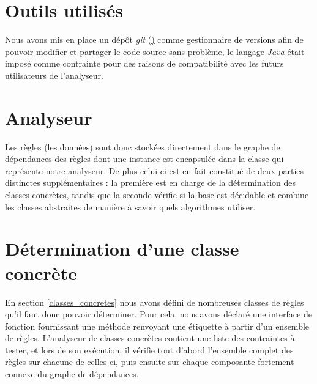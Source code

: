 
\section{Outils utilisés}\label{outils}
Nous avons mis en place un dépôt {\em git} (\href{}) 
comme gestionnaire de versions afin de pouvoir
modifier et partager le code source sans problème, le langage {\em Java} était imposé
comme contrainte
pour des raisons de compatibilité avec les futurs utilisateurs de l'analyseur.



\section{Analyseur}\label{impl_grd_analyser}
Les règles (les données) sont donc stockées directement dans le graphe de dépendances des
règles dont une instance est encapsulée dans la classe  qui représente
notre analyseur.
De plus celui-ci est en fait constitué de deux parties distinctes supplémentaires
: la première est en charge de la détermination des classes concrètes, tandis que la
seconde vérifie si la base est décidable et combine les classes
abstraites de manière à savoir quels algorithmes utiliser.

\section{Détermination d'une classe concrète}\label{impl_classe_concrete}
En section \ref{classes_concretes} nous avons défini de nombreuses classes de règles
qu'il faut donc pouvoir déterminer.
Pour cela, nous avons déclaré une interface de fonction 
fournissant une méthode renvoyant une étiquette à partir d'un ensemble de règles.
L'analyseur de classes concrètes contient une liste des contraintes à tester, et lors de
son exécution, il vérifie tout d'abord l'ensemble complet des règles sur chacune de
celles-ci, puis ensuite sur chaque composante fortement connexe du graphe de dépendances.


